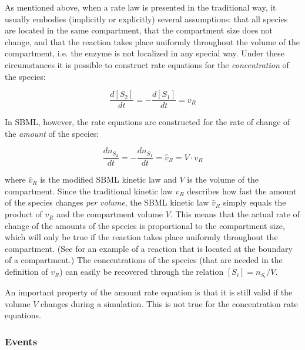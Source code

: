 As mentioned above, when a rate law is presented in the
traditional way, it usually embodies (implicitly or explicitly)
several assumptions: that all species are located in the same
compartment, that the compartment size does not change, and that
the reaction takes place uniformly throughout the volume of the
compartment, i.e. the enzyme is not localized in any special way.
Under these circumstances it is possible to construct rate
equations for the \emph{concentration} of the species:
\begin{linenomath}
  \begin{equation*}
    \frac{d[S_{2}]}{dt} = -\frac{d[S_{1}]}{dt} = v_{R}
  \end{equation*}
\end{linenomath}
In SBML, however, the rate equations are constructed for the rate
of change of the \emph{amount} of the species:
\begin{linenomath}
  \begin{equation*}
    \frac{dn_{S_{2}}}{dt} = -\frac{dn_{S_{1}}}{dt} = \hat{v}_{R} = V \cdot v_{R}
  \end{equation*}
\end{linenomath}
where $\hat{v}_{R}$ is the modified SBML kinetic law and $V$ is
the volume of the compartment.  Since the traditional kinetic law
$v_{R}$ describes how fast the amount of the species changes
\emph{per volume}, the SBML kinetic law $\hat{v}_{R}$ simply
equals the product of $v_{R}$ and the compartment volume $V$. This
means that the actual rate of change of the amounts of the species
is proportional to the compartment size, which will only be true
if the reaction takes place uniformly throughout the compartment.
(See  for an example of a
reaction that is located at the boundary of a compartment.)  The
concentrations of the species (that are needed in the definition
of $v_{R}$) can easily be recovered through the relation
$[S_{i}]=n_{S_{i}}/V$.

An important property of the amount rate equation is that it is still
valid if the volume $V$ changes during a simulation. This is not
true for the concentration rate equations. 


\subsubsection{Events}
\label{sec:bp:events}


